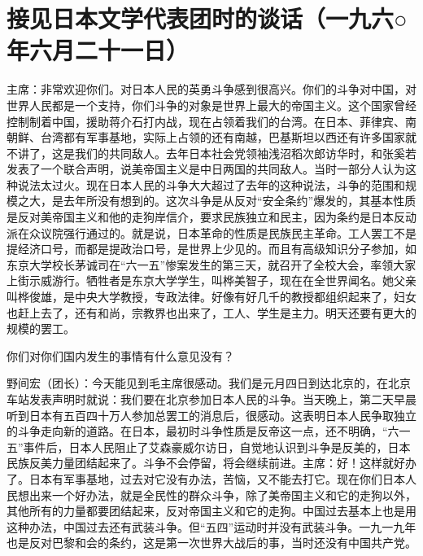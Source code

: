 \section[接见日本文学代表团时的谈话（一九六○年六月二十一日）]{接见日本文学代表团时的谈话（一九六○年六月二十一日）}


主席：非常欢迎你们。对日本人民的英勇斗争感到很高兴。你们的斗争对中国，对世界人民都是一个支持，你们斗争的对象是世界上最大的帝国主义。这个国家曾经控制制着中国，援助蒋介石打内战，现在占领着我们的台湾。在日本、菲律宾、南朝鲜、台湾都有军事基地，实际上占领的还有南越，巴基斯坦以西还有许多国家就不讲了，这是我们的共同敌人。去年日本社会党领袖浅沼稻次郎访华时，和张奚若发表了一个联合声明，说美帝国主义是中日两国的共同敌人。当时一部分人认为这种说法太过火。现在日本人民的斗争大大超过了去年的这种说法，斗争的范围和规模之大，是去年所没有想到的。这次斗争是从反对“安全条约”爆发的，其基本性质是反对美帝国主义和他的走狗岸信介，要求民族独立和民主，因为条约是日本反动派在众议院强行通过的。就是说，日本革命的性质是民族民主革命。工人罢工不是提经济口号，而都是提政治口号，是世界上少见的。而且有高级知识分子参加，如东京大学校长茅诚司在“六一五”惨案发生的第三天，就召开了全校大会，率领大家上街示威游行。牺牲者是东京大学学生，叫桦美智子，现在在全世界闻名。她父亲叫桦俊雄，是中央大学教授，专政法律。好像有好几千的教授都组织起来了，妇女也赶上去了，还有和尚，宗教界也出来了，工人、学生是主力。明天还要有更大的规模的罢工。

你们对你们国内发生的事情有什么意见没有？

野间宏（团长）：今天能见到毛主席很感动。我们是元月四日到达北京的，在北京车站发表声明时就说：我们要在北京参加日本人民的斗争。当天晚上，第二天早晨听到日本有五百四十万人参加总罢工的消息后，很感动。这表明日本人民争取独立的斗争走向新的道路。在日本，最初时斗争性质是反帝这一点，还不明确，“六一五”事件后，日本人民阻止了艾森豪威尔访日，自觉地认识到斗争是反美的，日本民族反美力量团结起来了。斗争不会停留，将会继续前进。主席：好！这样就好办了。日本有军事基地，过去对它没有办法，苦恼，又不能去打它。现在你们日本人民想出来一个好办法，就是全民性的群众斗争，除了美帝国主义和它的走狗以外，其他所有的力量都要团结起来，反对帝国主义和它的走狗。中国过去基本上也是用这种办法，中国过去还有武装斗争。但“五四”运动时并没有武装斗争。一九一九年也是反对巴黎和会的条约，这是第一次世界大战后的事，当时还没有中国共产党。

